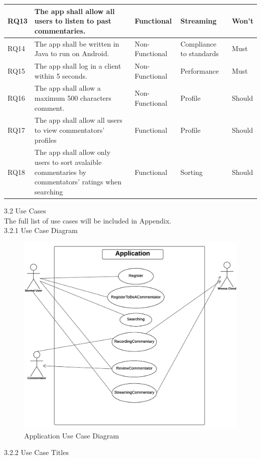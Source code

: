 \documentclass{article}
\begin{document}
\begin{flushleft}
\begin{tabular}[t]{| p{1cm} | p{6cm} | p{1.8cm} | p{2cm} | p{1.2cm} |}
RQ13 & The app shall allow all users to listen to past commentaries. & Functional & Streaming & Won't\\
\hline
RQ14 & The app shall be written in Java to run on Android. & Non-Functional & Compliance to standards & Must\\
\hline
RQ15 & The app shall log in a client within 5 seconds. & Non-Functional & Performance & Must\\
\hline
RQ16 & The app shall allow a maximum 500 characters comment. & Non-Functional & Profile & Should\\
\hline
RQ17 & The app shall allow all users to view commentators' profiles & Functional & Profile & Should\\
\hline
RQ18 & The app shall allow only users to sort avalaible commentaries by commentators' ratings when searching & Functional & Sorting & Should\\
\hline
\end{tabular}
{\Large 3.2 Use Cases}\\
The full list of use cases will be included in Appendix.\\
{\large 3.2.1 Use Case Diagram}\\
\begin{figure}[h]
    \centering
    \includegraphics[width=14cm]{use-case-diagram}
    \caption{Application Use Case Diagram}
    \label{fig:use-case-diagram}
\end{figure}
{\large 3.2.2 Use Case Titles}\\

\end{flushleft}
\end{document}
